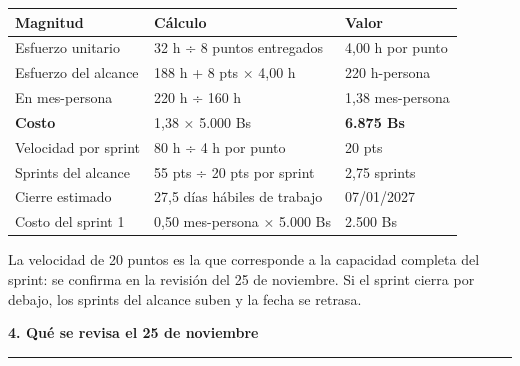 \documentclass[10pt,letterpaper]{article}
\newcommand{\seccion}[1]{%
  \par\vspace{6pt}%
  {\color{azul}\bfseries\large #1}\par
  \vspace{1pt}%
  {\color{linea}\hrule height 0.6pt}\vspace{3pt}%
}
\begin{document}
{\small
\begin{tabular}{@{}L{0.34\textwidth}L{0.32\textwidth}R{0.28\textwidth}@{}}
\toprule
{}
{\color{azul}\bfseries Magnitud} & {\color{azul}\bfseries Cálculo} &
{\color{azul}\bfseries Valor} \\
\midrule
Esfuerzo unitario & 32 h ÷ 8 puntos entregados & 4,00 h por punto \\
Esfuerzo del alcance & 188 h + 8 pts × 4,00 h & 220 h-persona \\
En mes-persona & 220 h ÷ 160 h & 1,38 mes-persona \\
\textbf{Costo} & 1,38 × 5.000 Bs & \textbf{6.875 Bs} \\
Velocidad por sprint & 80 h ÷ 4 h por punto & 20 pts \\
Sprints del alcance & 55 pts ÷ 20 pts por sprint & 2,75 sprints \\
Cierre estimado & 27,5 días hábiles de trabajo & 07/01/2027 \\
Costo del sprint 1 & 0,50 mes-persona × 5.000 Bs & 2.500 Bs \\
\bottomrule
\end{tabular}}

\vspace{2pt}
{\small\color{gris} La velocidad de 20 puntos es la que corresponde a la
capacidad completa del sprint: se confirma en la revisión del 25 de
noviembre. Si el sprint cierra por debajo, los sprints del alcance suben y
la fecha se retrasa.}

\seccion{4. Qué se revisa el 25 de noviembre}
\end{document}
